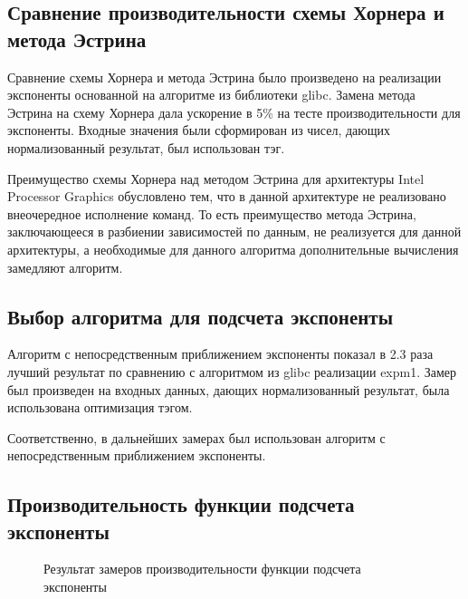 \subsection{Сравнение производительности схемы Хорнера и метода Эстрина}

Сравнение схемы Хорнера и метода Эстрина было произведено на реализации экспоненты основанной на алгоритме из библиотеки glibc.
Замена метода Эстрина на схему Хорнера дала ускорение в 5\% на тесте производительности для экспоненты.
Входные значения были сформирован из чисел, дающих нормализованный результат, был использован тэг.

Преимущество схемы Хорнера над методом Эстрина для архитектуры \foreignlanguage{english}{Intel Processor Graphics} обусловлено тем, что в данной архитектуре не реализовано внеочередное исполнение команд.
То есть преимущество метода Эстрина, заключающееся в разбиении зависимостей по данным, не реализуется для данной архитектуры, а необходимые для данного алгоритма дополнительные вычисления замедляют алгоритм.

\subsection{Выбор алгоритма для подсчета экспоненты}

Алгоритм с непосредственным приближением экспоненты показал в 2.3 раза лучший результат по сравнению с алгоритмом из glibc реализации expm1.
Замер был произведен на входных данных, дающих нормализованный результат, была использована оптимизация тэгом.

Соответственно, в дальнейших замерах был использован алгоритм с непосредственным приближением экспоненты.

\subsection{Производительность функции подсчета экспоненты}

\begin{figure}[h]
  \centering
  \caption{Результат замеров производительности функции подсчета экспоненты}
  \label{hist:exp:perf}
\end{figure}

